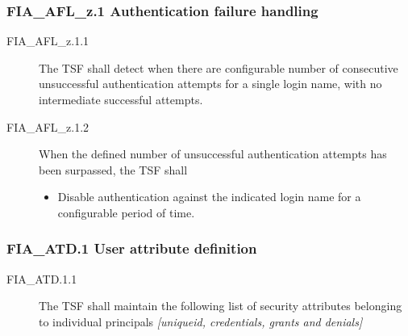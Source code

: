 \documentclass[10pt,a4paper,english]{article}
\begin{document}
\subsubsection*{FIA{\_}AFL{\_}z.1 Authentication failure handling}
\begin{description}
\item[FIA{\_}AFL{\_}z.1.1]

The TSF shall detect when there are configurable number of consecutive
unsuccessful authentication attempts for a single login name,
with no intermediate successful attempts.

\item[FIA{\_}AFL{\_}z.1.2 ]

When the defined number of unsuccessful authentication attempts
has been surpassed, the TSF shall
\begin{itemize}
\item {} 
Disable authentication against the indicated login name for a
configurable period of time.

\end{itemize}

\end{description}



\hypertarget{fia-atd-1-user-attribute-definition}{}
\subsubsection*{FIA{\_}ATD.1 User attribute definition}
\begin{description}
\item[FIA{\_}ATD.1.1 ]

The TSF shall maintain the following list of security attributes
belonging to individual principals \emph{{[}uniqueid, credentials, grants
and denials]}

\end{description}


\end{document}

